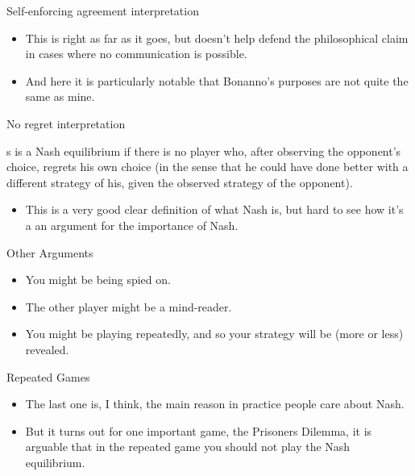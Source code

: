 \documentclass[
  ignorenonframetext,
]{beamer}
\providecommand{\tightlist}{%
  \setlength{\itemsep}{0pt}\setlength{\parskip}{0pt}}
\renewenvironment*{quote}	
	{\list{}{\rightmargin   \leftmargin} \item } 	
	{\endlist }
\begin{document}
\begin{frame}{Self-enforcing agreement interpretation}
\protect\hypertarget{self-enforcing-agreement-interpretation-1}{}
\begin{itemize}
\tightlist
\item
  This is right as far as it goes, but doesn't help defend the
  philosophical claim in cases where no communication is possible.
\item
  And here it is particularly notable that Bonanno's purposes are not
  quite the same as mine.
\end{itemize}
\end{frame}

\begin{frame}{No regret interpretation}
\protect\hypertarget{no-regret-interpretation}{}
\begin{quote}
s is a Nash equilibrium if there is no player who, after observing the
opponent's choice, regrets his own choice (in the sense that he could
have done better with a different strategy of his, given the observed
strategy of the opponent).
\end{quote}

\begin{itemize}
\tightlist
\item
  This is a very good clear definition of what Nash is, but hard to see
  how it's a an argument for the importance of Nash.
\end{itemize}
\end{frame}

\begin{frame}{Other Arguments}
\protect\hypertarget{other-arguments}{}
\begin{itemize}[<+->]
\tightlist
\item
  You might be being spied on.
\item
  The other player might be a mind-reader.
\item
  You might be playing repeatedly, and so your strategy will be (more or
  less) revealed.
\end{itemize}
\end{frame}

\begin{frame}{Repeated Games}
\protect\hypertarget{repeated-games}{}
\begin{itemize}
\tightlist
\item
  The last one is, I think, the main reason in practice people care
  about Nash.
\item
  But it turns out for one important game, the Prisoners Dilemma, it is
  arguable that in the repeated game you should not play the Nash
  equilibrium.
\end{itemize}
\end{frame}
\end{document}
